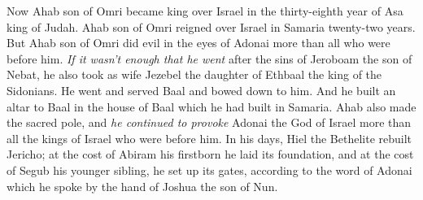 \begin{biblechapter}
 Now Ahab son of Omri became king over Israel in the thirty-eighth year of Asa king of Judah. Ahab son of Omri reigned over Israel in Samaria twenty-two years.
\verse But Ahab son of Omri did evil in the eyes of Adonai more than all who were before him.
\verse \textit{If it wasn’t enough that he went} after the sins of Jeroboam the son of Nebat, he also took as wife Jezebel the daughter of Ethbaal the king of the Sidonians. He went and served Baal and bowed down to him.
\verse And he built an altar to Baal in the house of Baal which he had built in Samaria.
\verse Ahab also made the sacred pole, and \textit{he continued to provoke} Adonai the God of Israel more than all the kings of Israel who were before him.
\verse In his days, Hiel the Bethelite rebuilt Jericho; at the cost of Abiram his firstborn he laid its foundation, and at the cost of Segub his younger sibling, he set up its gates, according to the word of Adonai which he spoke by the hand of Joshua the son of Nun.
\end{biblechapter}

